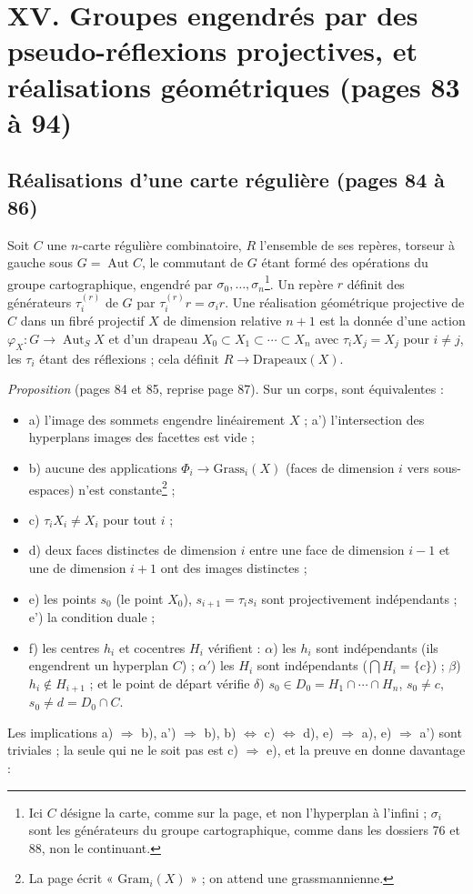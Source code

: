 \documentclass[11pt,a4paper]{article}
\begin{document}
\section*{XV. Groupes engendrés par des pseudo-réflexions projectives, et réalisations géométriques (pages 83 à 94)}

\subsection*{Réalisations d'une carte régulière (pages 84 à 86)}

Soit $C$ une $n$-carte régulière combinatoire, $R$ l'ensemble de ses repères,
torseur à gauche sous $G = \operatorname{Aut} C$, le commutant de $G$ étant
formé des opérations du groupe cartographique, engendré par $\sigma_0, \ldots,
\sigma_n$\footnote{Ici $C$ désigne la carte, comme sur la page, et non
l'hyperplan à l'infini ; $\sigma_i$ sont les générateurs du groupe
cartographique, comme dans les dossiers 76 et 88, non le continuant.}. Un repère
$r$ définit des générateurs $\tau_i^{(r)}$ de $G$ par $\tau_i^{(r)} r = \sigma_i
r$. Une réalisation géométrique projective de $C$ dans un fibré projectif $X$
de dimension relative $n+1$ est la donnée d'une action $\varphi_X \colon G \to
\operatorname{Aut}_S X$ et d'un drapeau $X_0 \subset X_1 \subset \cdots \subset
X_n$ avec $\tau_i X_j = X_j$ pour $i \neq j$, les $\tau_i$ étant des
réflexions ; cela définit $R \to \mathrm{Drapeaux}(X)$.

\emph{Proposition} (pages 84 et 85, reprise page 87). Sur un corps, sont
équivalentes :
\begin{itemize}
  \item a) l'image des sommets engendre linéairement $X$ ; a') l'intersection
    des hyperplans images des facettes est vide ;
  \item b) aucune des applications $\Phi_i \to \mathrm{Grass}_i(X)$ (faces de
    dimension $i$ vers sous-espaces) n'est constante\footnote{La page écrit
    « $\mathrm{Gram}_i(X)$ » ; on attend une grassmannienne.} ;
  \item c) $\tau_i X_i \neq X_i$ pour tout $i$ ;
  \item d) deux faces distinctes de dimension $i$ entre une face de dimension
    $i-1$ et une de dimension $i+1$ ont des images distinctes ;
  \item e) les points $s_0$ (le point $X_0$), $s_{i+1} = \tau_i s_i$ sont
    projectivement indépendants ; e') la condition duale ;
  \item f) les centres $h_i$ et cocentres $H_i$ vérifient : $\alpha$) les $h_i$
    sont indépendants (ils engendrent un hyperplan $C$) ; $\alpha'$) les $H_i$
    sont indépendants ($\bigcap H_i = \{c\}$) ; $\beta$) $h_i \notin H_{i+1}$ ;
    et le point de départ vérifie $\delta$) $s_0 \in D_0 = H_1 \cap \cdots
    \cap H_n$, $s_0 \neq c$, $s_0 \neq d = D_0 \cap C$.
\end{itemize}
Les implications a) $\Rightarrow$ b), a') $\Rightarrow$ b), b) $\Leftrightarrow$
c) $\Leftrightarrow$ d), e) $\Rightarrow$ a), e) $\Rightarrow$ a') sont
triviales ; la seule qui ne le soit pas est c)
$\Rightarrow$ e), et la preuve en donne davantage :
\end{document}
